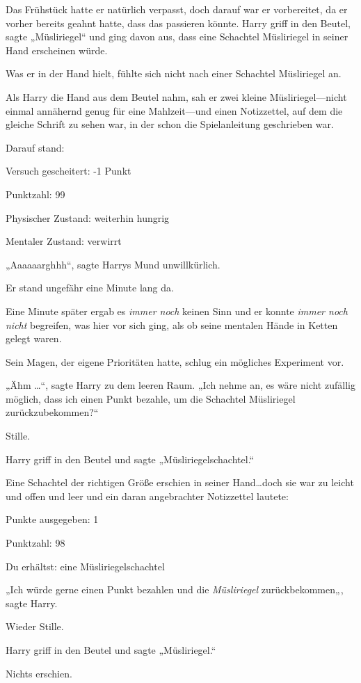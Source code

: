 {Das Frühstück hatte er natürlich verpasst, doch darauf war er vorbereitet, da er vorher bereits geahnt hatte, dass das passieren könnte. Harry griff in den Beutel, sagte „Müsliriegel“ und ging davon aus, dass eine Schachtel Müsliriegel in seiner Hand erscheinen würde.

Was er in der Hand hielt, fühlte sich nicht nach einer Schachtel Müsliriegel an.

Als Harry die Hand aus dem Beutel nahm, sah er zwei kleine Müsliriegel—nicht einmal annähernd genug für eine Mahlzeit—und einen Notizzettel, auf dem die gleiche Schrift zu sehen war, in der schon die Spielanleitung geschrieben war.

Darauf stand:

Versuch gescheitert: -1 Punkt

Punktzahl: 99

Physischer Zustand: weiterhin hungrig

Mentaler Zustand: verwirrt

„Aaaaaarghhh“, sagte Harrys Mund unwillkürlich.

Er stand ungefähr eine Minute lang da.

Eine Minute später ergab es \emph{immer noch} keinen Sinn und er konnte \emph{immer noch nicht} begreifen, was hier vor sich ging, als ob seine mentalen Hände in Ketten gelegt waren.

Sein Magen, der eigene Prioritäten hatte, schlug ein mögliches Experiment vor.

„Ähm …“, sagte Harry zu dem leeren Raum. „Ich nehme an, es wäre nicht zufällig möglich, dass ich einen Punkt bezahle, um die Schachtel Müsliriegel zurückzubekommen?“

Stille.

Harry griff in den Beutel und sagte „Müsliriegelschachtel.“

Eine Schachtel der richtigen Größe erschien in seiner Hand…doch sie war zu leicht und offen und leer und ein daran angebrachter Notizzettel lautete:

Punkte ausgegeben: 1

Punktzahl: 98

Du erhältst: eine Müsliriegelschachtel

„Ich würde gerne einen Punkt bezahlen und die \emph{Müsliriegel} zurückbekommen„, sagte Harry.

Wieder Stille.

Harry griff in den Beutel und sagte „Müsliriegel.“

Nichts erschien.

}
